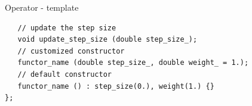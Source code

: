 \documentclass[hyperref,handout,compress,9pt,mathserif]{beamer}
\begin{document}
\begin{frame}[fragile]{Operator - template}
\begin{small}
\begin{lstlisting}
   // update the step size                                                                                                                               
   void update_step_size (double step_size_); 
   // customized constructor                                                                                                                                                                             
   functor_name (double step_size_, double weight_ = 1.);
   // default constructor                                                                                                                                                          
   functor_name () : step_size(0.), weight(1.) {}                                                                                                                                                                                                                                                                                                     
};                                                                                                                                                                                
\end{lstlisting}
\end{small}
\end{frame}
\end{document}
